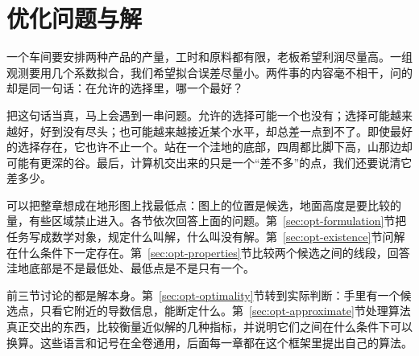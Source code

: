 \chapter{优化问题与解}
\label{chap:optimization}

一个车间要安排两种产品的产量，工时和原料都有限，老板希望利润尽量高。一组观测要用几个系数拟合，我们希望拟合误差尽量小。两件事的内容毫不相干，问的却是同一句话：在允许的选择里，哪一个最好？

把这句话当真，马上会遇到一串问题。允许的选择可能一个也没有；选择可能越来越好，好到没有尽头；也可能越来越接近某个水平，却总差一点到不了。即使最好的选择存在，它也许不止一个。站在一个洼地的底部，四周都比脚下高，山那边却可能有更深的谷。最后，计算机交出来的只是一个“差不多”的点，我们还要说清它差多少。

可以把整章想成在地形图上找最低点：图上的位置是候选，地面高度是要比较的量，有些区域禁止进入。各节依次回答上面的问题。第~\ref{sec:opt-formulation}节把任务写成数学对象，规定什么叫解，什么叫没有解。第~\ref{sec:opt-existence}节问解在什么条件下一定存在。第~\ref{sec:opt-properties}节比较两个候选之间的线段，回答洼地底部是不是最低处、最低点是不是只有一个。

前三节讨论的都是解本身。第~\ref{sec:opt-optimality}节转到实际判断：手里有一个候选点，只看它附近的导数信息，能断定什么。第~\ref{sec:opt-approximate}节处理算法真正交出的东西，比较衡量近似解的几种指标，并说明它们之间在什么条件下可以换算。这些语言和记号在全卷通用，后面每一章都在这个框架里提出自己的算法。







